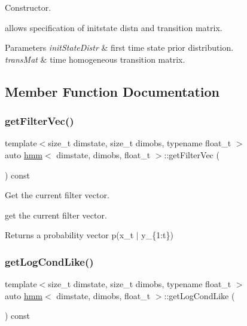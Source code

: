 Constructor. 

allows specification of initstate distn and transition matrix. 
\begin{DoxyParams}{Parameters}
{\em init\+State\+Distr} & first time state prior distribution. \\
\hline
{\em trans\+Mat} & time homogeneous transition matrix. \\
\hline
\end{DoxyParams}


\subsection{Member Function Documentation}
\mbox{\label{classhmm_a670de13d08520008774ee31b3712b5b5}} 
\subsubsection{\texorpdfstring{get\+Filter\+Vec()}{getFilterVec()}}
{\footnotesize\ttfamily template$<$size\+\_\+t dimstate, size\+\_\+t dimobs, typename float\+\_\+t $>$ \\
auto \hyperlink{classhmm}{hmm}$<$ dimstate, dimobs, float\+\_\+t $>$\+::get\+Filter\+Vec (\begin{DoxyParamCaption}{ }\end{DoxyParamCaption}) const}



Get the current filter vector. 

get the current filter vector. \begin{DoxyReturn}{Returns}
a probability vector p(x\+\_\+t $\vert$ y\+\_\+\{1\+:t\}) 
\end{DoxyReturn}
\mbox{\label{classhmm_a588f2aed002614e75f523213eba1b290}} 
\subsubsection{\texorpdfstring{get\+Log\+Cond\+Like()}{getLogCondLike()}}
{\footnotesize\ttfamily template$<$size\+\_\+t dimstate, size\+\_\+t dimobs, typename float\+\_\+t $>$ \\
auto \hyperlink{classhmm}{hmm}$<$ dimstate, dimobs, float\+\_\+t $>$\+::get\+Log\+Cond\+Like (\begin{DoxyParamCaption}{ }\end{DoxyParamCaption}) const\hspace{0.3cm}{\ttfamily [virtual]}}



